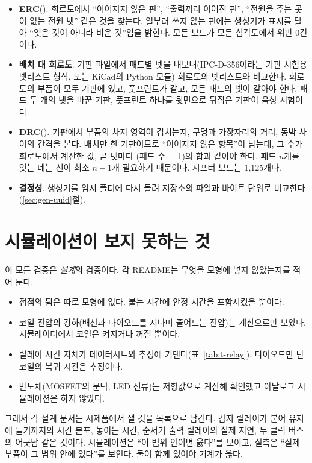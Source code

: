 \begin{itemize}
\item \textbf{ERC}(). 회로도에서 ``이어지지 않은 핀'', ``출력끼리 이어진
핀'', ``전원을 주는 곳이 없는 전원 넷'' 같은 것을 찾는다. 일부러 쓰지 않는 핀에는 생성기가  표시를
달아 ``잊은 것이 아니라 비운 것''임을 밝힌다. 모든 보드가 모든 심각도에서 위반 0건이다.
\item \textbf{배치 대 회로도}. 기판 파일에서 패드별 넷을 내보내(IPC-D-356이라는 기판 시험용 넷리스트 형식, 또는
KiCad의 Python 모듈) 회로도의 넷리스트와 비교한다. 회로도의 부품이 모두 기판에 있고, 풋프린트가 같고, 모든 패드의
넷이 같아야 한다. 패드 두 개의 넷을 바꾼 기판, 풋프린트 하나를 뒷면으로 뒤집은 기판이 음성 시험이다.
\item \textbf{DRC}(). 기판에서 부품의 차지 영역이 겹치는지, 구멍과 가장자리의
거리, 동박 사이의 간격을 본다. 배치만 한 기판이므로 ``이어지지 않은 항목''이 남는데, 그 수가 회로도에서 계산한
값, 곧 넷마다 (패드 수 $-$ 1)의 합과 같아야 한다. 패드 $n$개를 잇는 데는 선이 최소 $n-1$개 필요하기 때문이다.
시프터 보드는 1,125개다.
\item \textbf{결정성}. 생성기를 임시 폴더에 다시 돌려 저장소의 파일과 바이트 단위로 비교한다(\ref{sec:gen-uuid}절).
\end{itemize}

\section{시뮬레이션이 보지 못하는 것}\label{sec:v-blind}

이 모든 검증은 \emph{설계}의 검증이다. 각 README는 무엇을 모형에 넣지 않았는지를 적어 둔다.

\begin{itemize}
\item 접점의 튐은 따로 모형에 없다. 붙는 시간에 안정 시간을 포함시켰을 뿐이다.
\item 코일 전압의 강하(배선과 다이오드를 지나며 줄어드는 전압)는 계산으로만 보았다. 시뮬레이터에서 코일은 켜지거나
꺼질 뿐이다.
\item 릴레이 시간 자체가 데이터시트와 추정에 기댄다(표~\ref{tab:t-relay}). 다이오드만 단 코일의 복귀 시간은 추정이다.
\item 반도체(MOSFET의 문턱, LED 전류)는 저항값으로 계산해 확인했고 아날로그 시뮬레이션은 하지 않았다.
\end{itemize}

그래서 각 설계 문서는 시제품에서 잴 것을 목록으로 남긴다. 감지 릴레이가 붙어 유지에 들기까지의 시간 분포,
놓이는 시간, 순서기 출력 릴레이의 실제 지연, 두 클럭 버스의 어긋남 같은 것이다. 시뮬레이션은 ``이 범위 안이면
옳다''를 보이고, 실측은 ``실제 부품이 그 범위 안에 있다''를 보인다. 둘이 함께 있어야 기계가 옳다.

